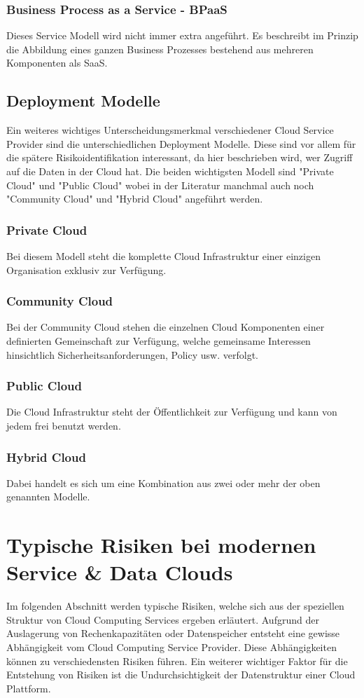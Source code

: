 \documentclass[a4paper,11pt]{article}
\begin{document}
\subsubsection{Business Process as a Service - BPaaS}
Dieses Service Modell wird nicht immer extra angeführt. Es beschreibt im Prinzip die Abbildung eines ganzen Business Prozesses bestehend aus mehreren Komponenten als SaaS.

\subsection{Deployment Modelle}
Ein weiteres wichtiges Unterscheidungsmerkmal verschiedener Cloud Service Provider sind die unterschiedlichen Deployment Modelle. Diese sind vor allem für die spätere Risikoidentifikation interessant, da hier beschrieben wird, wer Zugriff auf die Daten in der Cloud hat. Die beiden wichtigsten Modell sind "Private Cloud" und "Public Cloud" wobei in der Literatur manchmal auch noch "Community Cloud" und "Hybrid Cloud" angeführt werden.

\subsubsection{Private Cloud}
Bei diesem Modell steht die komplette Cloud Infrastruktur einer einzigen Organisation exklusiv zur Verfügung.

\subsubsection{Community Cloud}
Bei der Community Cloud stehen die einzelnen Cloud Komponenten einer definierten Gemeinschaft zur Verfügung, welche gemeinsame Interessen hinsichtlich Sicherheitsanforderungen, Policy usw. verfolgt.

\subsubsection{Public Cloud}
Die Cloud Infrastruktur steht der Öffentlichkeit zur Verfügung und kann von jedem frei benutzt werden.

\subsubsection{Hybrid Cloud}
Dabei handelt es sich um eine Kombination aus zwei oder mehr der oben genannten Modelle.

\section{Typische Risiken bei modernen Service \& Data Clouds}
Im folgenden Abschnitt werden typische Risiken, welche sich aus der speziellen Struktur von Cloud Computing Services ergeben erläutert. Aufgrund der Auslagerung von Rechenkapazitäten oder Datenspeicher entsteht eine gewisse Abhängigkeit vom Cloud Computing Service Provider. Diese Abhängigkeiten können zu verschiedensten Risiken führen. Ein weiterer wichtiger Faktor für die Entstehung von Risiken ist die Undurchsichtigkeit der Datenstruktur einer Cloud Plattform.  
\end{document}
